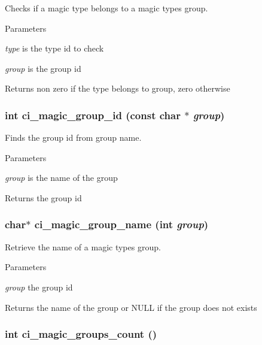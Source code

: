 Checks if a magic type belongs to a magic types group. 
\begin{DoxyParams}{Parameters}
\item[{\em type}]is the type id to check \item[{\em group}]is the group id \end{DoxyParams}
\begin{DoxyReturn}{Returns}
non zero if the type belongs to group, zero otherwise 
\end{DoxyReturn}
\hypertarget{group__DATATYPE_ga5f080fa00aab37ca373b4b695d68aafa}{
\subsubsection[{ci\_\-magic\_\-group\_\-id}]{\setlength{\rightskip}{0pt plus 5cm}int ci\_\-magic\_\-group\_\-id (const char $\ast$ {\em group})}}
\label{group__DATATYPE_ga5f080fa00aab37ca373b4b695d68aafa}


Finds the group id from group name. 
\begin{DoxyParams}{Parameters}
\item[{\em group}]is the name of the group \end{DoxyParams}
\begin{DoxyReturn}{Returns}
the group id 
\end{DoxyReturn}
\hypertarget{group__DATATYPE_ga0862bc88a22fcb42f18b2a48bf56ddd0}{
\subsubsection[{ci\_\-magic\_\-group\_\-name}]{\setlength{\rightskip}{0pt plus 5cm}char$\ast$ ci\_\-magic\_\-group\_\-name (int {\em group})}}
\label{group__DATATYPE_ga0862bc88a22fcb42f18b2a48bf56ddd0}


Retrieve the name of a magic types group. 
\begin{DoxyParams}{Parameters}
\item[{\em group}]the group id \end{DoxyParams}
\begin{DoxyReturn}{Returns}
the name of the group or NULL if the group does not exists 
\end{DoxyReturn}
\hypertarget{group__DATATYPE_gabf2d67fabccd0c3776d628345413d5ae}{
\subsubsection[{ci\_\-magic\_\-groups\_\-count}]{\setlength{\rightskip}{0pt plus 5cm}int ci\_\-magic\_\-groups\_\-count ()}}
\label{group__DATATYPE_gabf2d67fabccd0c3776d628345413d5ae}


